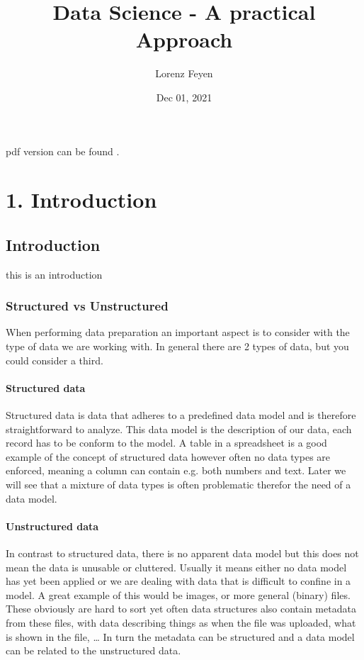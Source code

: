 \documentclass[letterpaper,10pt,english]{jupyterBook}
\title{Data Science - A practical Approach}
\date{Dec 01, 2021}
\author{Lorenz Feyen}
\begin{document}
\pagestyle{empty}
\sphinxmaketitle
\pagestyle{plain}
\sphinxtableofcontents
\pagestyle{normal}
\label{\detokenize{foreword::doc}}


\sphinxAtStartPar
pdf version can be found .


\part{1. Introduction}


\chapter{Introduction}
\label{\detokenize{c1_introduction/introduction:introduction}}\label{\detokenize{c1_introduction/introduction::doc}}
\sphinxAtStartPar
this is an introduction


\section{Structured vs Unstructured}
\label{\detokenize{c1_introduction/introduction:structured-vs-unstructured}}
\sphinxAtStartPar
When performing data preparation an important aspect is to consider with the type of data we are working with.
In general there are 2 types of data, but you could consider a third.


\subsection{Structured data}
\label{\detokenize{c1_introduction/introduction:structured-data}}
\sphinxAtStartPar
Structured data is data that adheres to a pre\sphinxhyphen{}defined data model and is therefore straightforward to analyze.
This data model is the description of our data, each record has to be conform to the model.
A table in a spreadsheet is a good example of the concept of structured data however often no data types are enforced, meaning a column can contain e.g. both numbers and text.
Later we will see that a mixture of data types is often problematic therefor the need of a data model.


\subsection{Unstructured data}
\label{\detokenize{c1_introduction/introduction:unstructured-data}}
\sphinxAtStartPar
In contrast to structured data, there is no apparent data model but this does not mean the data is unusable or cluttered.
Usually it means either no data model has yet been applied or we are dealing with data that is difficult to confine in a model.
A great example of this would be images, or more general (binary) files.
These obviously are hard to sort yet often data structures also contain metadata from these files, with data describing things as when the file was uploaded, what is shown in the file, …
In turn the metadata can be structured and a data model can be related to the unstructured data.
\end{document}
